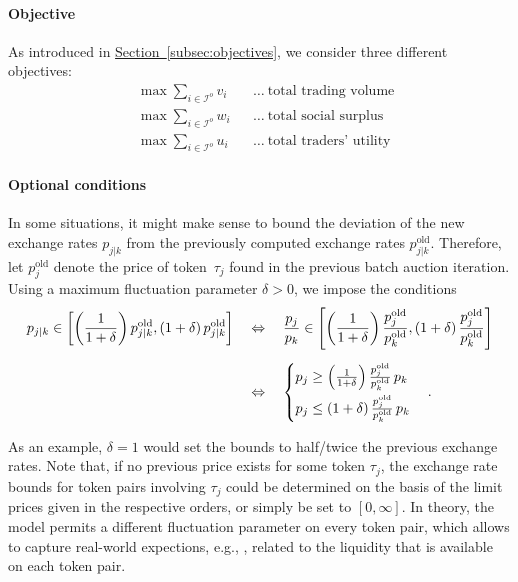 \documentclass[11pt,parskip=full]{scrartcl}%
\newcommand*{\eg}{e.g., }
\newcommand*{\iorders}{\mathcal{I}^o}       %
\newcommand*{\secref}[1]{\hyperref[{#1}]{Section~\ref*{#1}}}
\begin{document}
\paragraph{Objective}

As introduced in \secref{subsec:objectives}, we consider three different objectives:
\begin{align*}
  && &\max\sum_{i \in \iorders} v_i && \ldots\>\text{total trading volume}&&\\
  && &\max\sum_{i \in \iorders} w_i && \ldots\>\text{total social surplus}&&\\
  && &\max\sum_{i \in \iorders} u_i && \ldots\>\text{total traders' utility}&&
\end{align*}


\paragraph{Optional conditions}

In some situations, it might make sense to bound the deviation of the new exchange rates $p_{j|k}$ from the previously computed exchange rates $ p_{j|k}^\mathrm{old} $.
Therefore, let $ p^\mathrm{old}_j $ denote the price of token~$ \tau_j $ found in the previous
batch auction iteration.
Using a maximum fluctuation parameter $ \delta > 0 $, we impose the conditions
\begin{align}
  p_{j|k} \in
  \left[
    \left(\frac{1}{1+\delta}\right) p^\mathrm{old}_{j|k},
    (1+\delta) \, p^\mathrm{old}_{j|k}
  \right]
  \quad &\Leftrightarrow \quad
  \frac{p_j}{p_k} \in
  \left[
    \left(\frac{1}{1+\delta}\right) \frac{p^\mathrm{old}_j}{p^\mathrm{old}_k},
    (1+\delta) \, \frac{p^\mathrm{old}_j}{p^\mathrm{old}_k}
  \right]\notag\\[2mm]
  \quad &\Leftrightarrow \quad
  \begin{cases}
    p_j \ge \left(\frac{1}{1+\delta}\right) \frac{p^\mathrm{old}_j}{p^\mathrm{old}_k} \, p_k
    \\[2mm]
    p_j \le \left(1+\delta\right) \frac{p^\mathrm{old}_j}{p^\mathrm{old}_k} \, p_k
  \end{cases}.
  \label{eq:bounds_xrates}
\end{align}

As an example, $ \delta = 1 $ would set the bounds to half/twice the previous exchange rates.
Note that, if no previous price exists for some token $ \tau_j $, the exchange rate bounds for
token pairs involving $ \tau_j $ could be determined on the basis of the limit prices given in
the respective orders, or simply be set to $ [0,\infty] $.
In theory, the model permits a different fluctuation parameter on every token pair, which allows to
capture real-world expections, \eg, related to the liquidity that is available on each token pair. 
\end{document}
